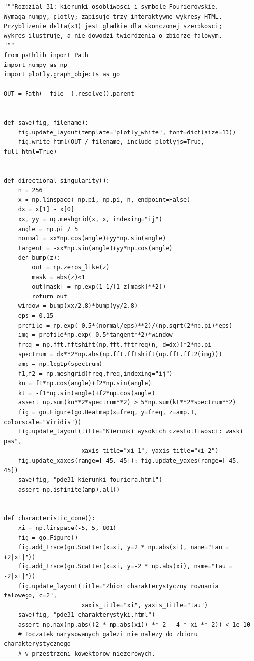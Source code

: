 \begin{lstlisting}[style=pythonpde,caption={Eksperymenty rozdziału 31 (Python i Plotly)},label={code:pde31-plotly}]
"""Rozdzial 31: kierunki osobliwosci i symbole Fourierowskie.
Wymaga numpy, plotly; zapisuje trzy interaktywne wykresy HTML.
Przyblizenie delta(x1) jest gladkie dla skonczonej szerokosci;
wykres ilustruje, a nie dowodzi twierdzenia o zbiorze falowym.
"""
from pathlib import Path
import numpy as np
import plotly.graph_objects as go

OUT = Path(__file__).resolve().parent


def save(fig, filename):
    fig.update_layout(template="plotly_white", font=dict(size=13))
    fig.write_html(OUT / filename, include_plotlyjs=True, full_html=True)


def directional_singularity():
    n = 256
    x = np.linspace(-np.pi, np.pi, n, endpoint=False)
    dx = x[1] - x[0]
    xx, yy = np.meshgrid(x, x, indexing="ij")
    angle = np.pi / 5
    normal = xx*np.cos(angle)+yy*np.sin(angle)
    tangent = -xx*np.sin(angle)+yy*np.cos(angle)
    def bump(z):
        out = np.zeros_like(z)
        mask = abs(z)<1
        out[mask] = np.exp(1-1/(1-z[mask]**2))
        return out
    window = bump(xx/2.8)*bump(yy/2.8)
    eps = 0.15
    profile = np.exp(-0.5*(normal/eps)**2)/(np.sqrt(2*np.pi)*eps)
    img = profile*np.exp(-0.5*tangent**2)*window
    freq = np.fft.fftshift(np.fft.fftfreq(n, d=dx))*2*np.pi
    spectrum = dx**2*np.abs(np.fft.fftshift(np.fft.fft2(img)))
    amp = np.log1p(spectrum)
    f1,f2 = np.meshgrid(freq,freq,indexing="ij")
    kn = f1*np.cos(angle)+f2*np.sin(angle)
    kt = -f1*np.sin(angle)+f2*np.cos(angle)
    assert np.sum(kn**2*spectrum**2) > 5*np.sum(kt**2*spectrum**2)
    fig = go.Figure(go.Heatmap(x=freq, y=freq, z=amp.T, colorscale="Viridis"))
    fig.update_layout(title="Kierunki wysokich czestotliwosci: waski pas",
                      xaxis_title="xi_1", yaxis_title="xi_2")
    fig.update_xaxes(range=[-45, 45]); fig.update_yaxes(range=[-45, 45])
    save(fig, "pde31_kierunki_fouriera.html")
    assert np.isfinite(amp).all()


def characteristic_cone():
    xi = np.linspace(-5, 5, 801)
    fig = go.Figure()
    fig.add_trace(go.Scatter(x=xi, y=2 * np.abs(xi), name="tau = +2|xi|"))
    fig.add_trace(go.Scatter(x=xi, y=-2 * np.abs(xi), name="tau = -2|xi|"))
    fig.update_layout(title="Zbior charakterystyczny rownania falowego, c=2",
                      xaxis_title="xi", yaxis_title="tau")
    save(fig, "pde31_charakterystyki.html")
    assert np.max(np.abs((2 * np.abs(xi)) ** 2 - 4 * xi ** 2)) < 1e-10
    # Poczatek narysowanych galezi nie nalezy do zbioru charakterystycznego
    # w przestrzeni kowektorow niezerowych.



\end{lstlisting}
